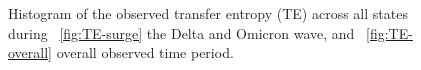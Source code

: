 \documentclass[conference,compsoc]{IEEEtran}
\begin{document}
\begin{figure}[!t]
    \centering
     \hfil
     \caption{Histogram of the observed transfer entropy (TE) across all states during ~\ref{fig:TE-surge} the Delta and Omicron wave, and ~\ref{fig:TE-overall} overall observed time period.  }
 \end{figure}



\end{document}
